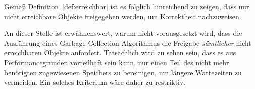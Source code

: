 Gemäß Definition~\ref{def:erreichbar} ist es folglich hinreichend zu zeigen, dass nur nicht erreichbare Objekte freigegeben werden, um Korrektheit nachzuweisen.

An dieser Stelle ist erwähnenswert, warum nicht vorausgesetzt wird, dass die Ausführung eines Garbage-Collection-Algorithmus die Freigabe \textit{sämtlicher} nicht erreichbaren Objekte anfordert.
Tatsächlich wird zu sehen sein, dass es aus Performancegründen vorteilhaft sein kann, nur einen Teil des nicht mehr benötigten zugewiesenen Speichers zu bereinigen, um längere Wartezeiten zu vermeiden.
Ein solches Kriterium wäre daher zu restriktiv.